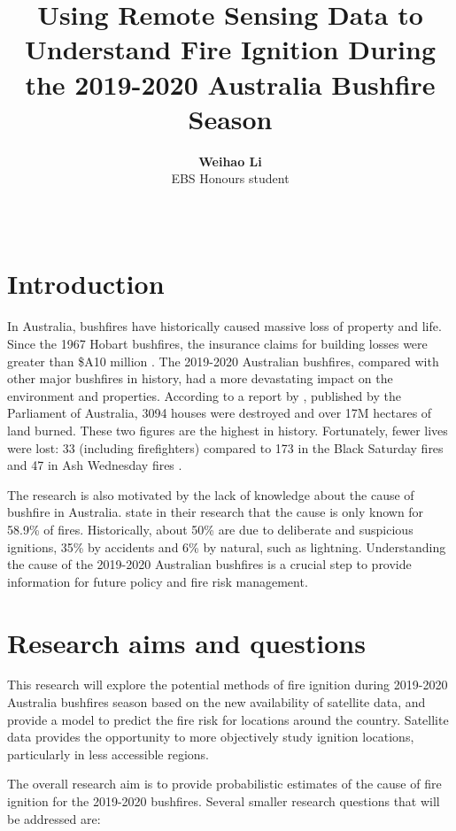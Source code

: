 \documentclass[11pt,a4paper,]{article}
\title{Using Remote Sensing Data to Understand Fire Ignition During the 2019-2020 Australia Bushfire Season}
\author{\sf\Large\textbf{ Weihao Li}\\ {\sf\large EBS Honours student\\[0.5cm]}}
\date{\sf\Date~\Month~\Year}
\makeatletter
\def\titlepage{\front{\expandafter{\@title}}{\@author}{\@organization}}
\makeatother
\begin{document}
\titlepage

\hypertarget{introduction}{%
\section{Introduction}\label{introduction}}

In Australia, bushfires have historically caused massive loss of property and life. Since the 1967 Hobart bushfires, the insurance claims for building losses were greater than \$A10 million \autocite{mcaneney2009100}.
The 2019-2020 Australian bushfires, compared with other major bushfires in history, had a more devastating impact on the environment and properties. According to a report by \textcite{LisaRichardsNigelBrew2020}, published by the Parliament of Australia, 3094 houses were destroyed and over 17M hectares of land burned. These two figures are the highest in history. Fortunately, fewer lives were lost: 33 (including firefighters) compared to 173 in the Black Saturday fires and 47 in Ash Wednesday fires \autocite{LisaRichardsNigelBrew2020}.

The research is also motivated by the lack of knowledge about the cause of bushfire in Australia. \textcite{beale2011preventing} state in their research that the cause is only known for 58.9\% of fires. Historically, about 50\% are due to deliberate and suspicious ignitions, 35\% by accidents and 6\% by natural, such as lightning. Understanding the cause of the 2019-2020 Australian bushfires is a crucial step to provide information for future policy and fire risk management.

\hypertarget{research-aims-and-questions}{%
\section{Research aims and questions}\label{research-aims-and-questions}}

This research will explore the potential methods of fire ignition during 2019-2020 Australia bushfires season based on the new availability of satellite data, and provide a model to predict the fire risk for locations around the country. Satellite data provides the opportunity to more objectively study ignition locations, particularly in less accessible regions.

The overall research aim is to provide probabilistic estimates of the cause of fire ignition for the 2019-2020 bushfires. Several smaller research questions that will be addressed are:
\end{document}

